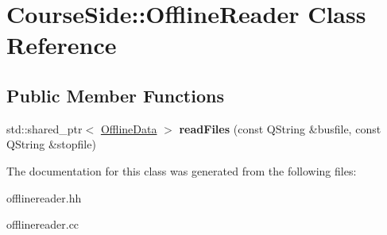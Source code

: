 \hypertarget{classCourseSide_1_1OfflineReader}{\section{Course\-Side\-:\-:Offline\-Reader Class Reference}
\label{classCourseSide_1_1OfflineReader}
}
\subsection*{Public Member Functions}
\begin{DoxyCompactItemize}
\item 
\hypertarget{classCourseSide_1_1OfflineReader_a95ab469154bf7738c300744c09951333}{std\-::shared\-\_\-ptr$<$ \hyperlink{structCourseSide_1_1OfflineData}{Offline\-Data} $>$ {\bfseries read\-Files} (const Q\-String \&busfile, const Q\-String \&stopfile)}\label{classCourseSide_1_1OfflineReader_a95ab469154bf7738c300744c09951333}

\end{DoxyCompactItemize}


The documentation for this class was generated from the following files\-:\begin{DoxyCompactItemize}
\item 
offlinereader.\-hh\item 
offlinereader.\-cc\end{DoxyCompactItemize}
